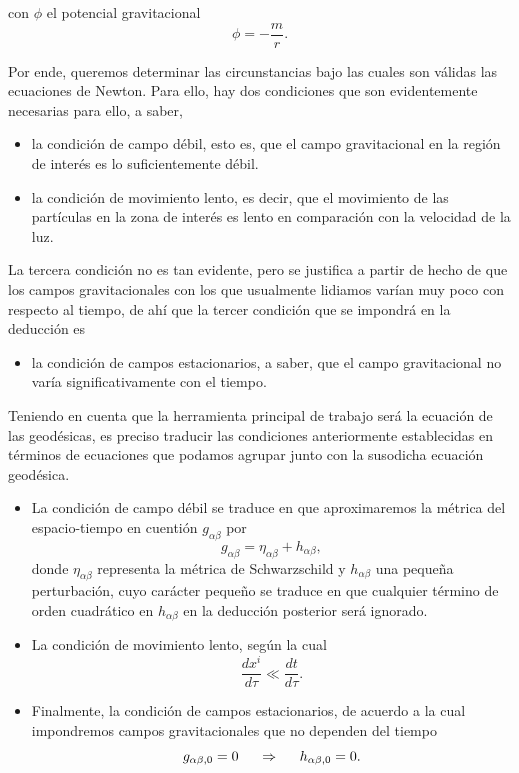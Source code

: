 \documentclass{article}
\numberwithin{equation}{section}
\theoremstyle{definition}
\begin{document}
con $\phi$ el potencial gravitacional
\begin{equation*}
\phi = - \frac{m}{r}.
\end{equation*}

Por ende, queremos determinar las circunstancias bajo las cuales son válidas las ecuaciones de Newton. Para ello, hay dos condiciones que son evidentemente necesarias para ello, a saber,
\begin{itemize}
\item la condición de campo débil, esto es, que el campo gravitacional en la región de interés es lo suficientemente débil.
\item la condición de movimiento lento, es decir, que el movimiento de las partículas en la zona de interés es lento en comparación con la velocidad de la luz.
\end{itemize}

La tercera condición no es tan evidente, pero se justifica a partir de hecho de que los campos gravitacionales con los que usualmente lidiamos varían muy poco con respecto al tiempo, de ahí que la tercer condición que se impondrá en la deducción es
\begin{itemize}
\item la condición de campos estacionarios, a saber, que el campo gravitacional no varía significativamente con el tiempo.
\end{itemize}

Teniendo en cuenta que la herramienta principal de trabajo será la ecuación de las geodésicas, es preciso traducir las condiciones anteriormente establecidas en términos de ecuaciones que podamos agrupar junto con la susodicha ecuación geodésica.\\
\begin{itemize}
\item La condición de campo débil se traduce en que aproximaremos la métrica del espacio-tiempo en cuentión $g_{\alpha \beta}$ por 
\begin{equation}
\label{weak field}
g_{\alpha \beta} = \eta_{\alpha \beta} + h_{\alpha \beta},
\end{equation}
donde $\eta_{\alpha \beta}$ representa la métrica de Schwarzschild y $h_{\alpha \beta}$ una pequeña perturbación, cuyo carácter pequeño se traduce en que cualquier término de orden cuadrático en $h_{\alpha \beta}$ en la deducción posterior será ignorado.
\item La condición de movimiento lento, según la cual
\begin{equation*}
\frac{dx^i}{d\tau} \ll \frac{dt}{d\tau}.
\end{equation*}
\item Finalmente, la condición de campos estacionarios, de acuerdo a la cual impondremos campos gravitacionales que no dependen del tiempo
\begin{equation*}
g_{\alpha \beta,0} =0 \hspace{.5cm}\Rightarrow\hspace{.5cm} h_{\alpha \beta,0} =0.
\end{equation*}
\end{itemize}
\end{document}
